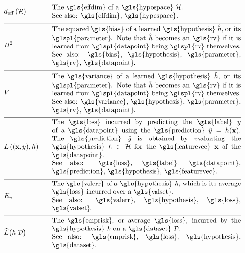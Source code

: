\begin{align}
	&\effdim{\hypospace}  &\quad & \parbox{.80\textwidth}{The \gls{effdim} of a \gls{hypospace} $\hypospace$.
		\\ See also: \gls{effdim}, \gls{hypospace}. }   \nonumber \\[2mm] \hline \nonumber\\[-5mm]
	&\biasterm^2 &\quad &\parbox{.80\textwidth}{
		The squared \gls{bias} of a learned \gls{hypothesis} $\learnthypothesis$, or its \glspl{parameter}. Note that $\learnthypothesis$ 
		becomes an \gls{rv} if it is learned from \glspl{datapoint} being \glspl{rv} themselves.
		\\ See also: \gls{bias}, \gls{hypothesis}, \gls{parameter}, \gls{rv}, \gls{datapoint}. } \nonumber  \nonumber \\[2mm] \hline \nonumber\\[-5mm]
	&\varianceterm &\quad &\parbox{.80\textwidth}{The \gls{variance} of a learned 
	  	\gls{hypothesis} $\learnthypothesis$, or its \glspl{parameter}. Note that $\learnthypothesis$ 
	  	becomes an \gls{rv} if it is learned from \glspl{datapoint} being \glspl{rv} themselves.
		\\ See also: \gls{variance}, \gls{hypothesis}, \gls{parameter}, \gls{rv}, \gls{datapoint}. } \nonumber \nonumber \\[2mm] \hline \nonumber\\[-5mm]
	&\lossfunc{(\featurevec,\truelabel)}{\hypothesis}  &\quad & \parbox{.80\textwidth}{The \gls{loss} incurred by predicting the 
		\gls{label} $\truelabel$ of a \gls{datapoint} using the \gls{prediction} $\hat{\truelabel}=h(\featurevec)$. The 
		\gls{prediction} $\hat{\truelabel}$ is obtained by evaluating the \gls{hypothesis} $\hypothesis \in \hypospace$ for 
		the \gls{featurevec} $\featurevec$ of the \gls{datapoint}.
		\\ See also: \gls{loss}, \gls{label}, \gls{datapoint}, \gls{prediction}, \gls{hypothesis}, 
		\gls{featurevec}. }    \nonumber  \nonumber \\[2mm] \hline \nonumber\\[-5mm] 
	&\valerror &\quad &\parbox{.80\textwidth}{The \gls{valerr} of a \gls{hypothesis} $\hypothesis$, which is its 
		average \gls{loss} incurred over a \gls{valset}.
		\\ See also: \gls{valerr}, \gls{hypothesis}, \gls{loss}, \gls{valset}. }  \nonumber \\[2mm] \hline \nonumber\\[-5mm]
	&\emperror\big(\hypothesis| \dataset \big) &\quad &\parbox{.80\textwidth}{The \gls{emprisk}, or average \gls{loss}, 
		incurred by the \gls{hypothesis} $\hypothesis$ on a \gls{dataset} $\dataset$.
		\\ See also: \gls{emprisk}, \gls{loss}, \gls{hypothesis}, \gls{dataset}. } \nonumber 
\end{align}     

